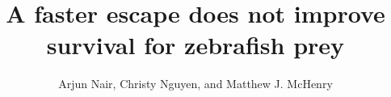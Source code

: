 \documentclass[]{rsos}%
\begin{document}
\title{A faster escape does not improve survival for zebrafish prey}


\author{%
Arjun Nair, Christy Nguyen, and Matthew J. McHenry}

\address{Department of Ecology and Evolutionary Biology\\
University of California, Irvine\\
321 Steinhaus Hall\\
Irvine, CA 92697}

\subject{Animal behavior, biomechanics}






\maketitle




\linespread{1.6}\selectfont %
\end{document}

